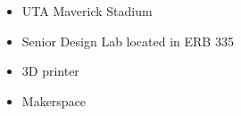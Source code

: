 
\begin{itemize}
  \item UTA Maverick Stadium
  \item Senior Design Lab located in ERB 335
  \item 3D printer
  \item Makerspace
\end{itemize}